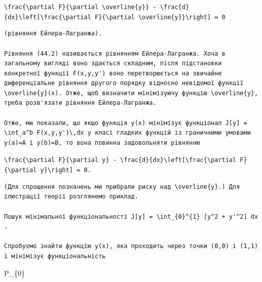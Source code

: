 \documentclass[
  ukrainian,
]{article}
\begin{document}
\texttt{\textbackslash{}frac\{\textbackslash{}partial\ F\}\{\textbackslash{}partial\ \textbackslash{}overline\{y\}\}\ -\ \textbackslash{}frac\{d\}\{dx\}\textbackslash{}left{[}\textbackslash{}frac\{\textbackslash{}partial\ F\}\{\textbackslash{}partial\ \textbackslash{}overline\{y\textquotesingle{}\}\}\textbackslash{}right{]}\ =\ 0}

\begin{verbatim}
(рівняння Ейлера-Лагранжа).

Рівняння (44.2) називається рівнянням Ейлера-Лагранжа. Хоча в загальному вигляді воно здається складним, після підстановки конкретної функції F(x,y,y') воно перетворюється на звичайне диференціальне рівняння другого порядку відносно невідомої функції \overline{y}(x). Отже, щоб визначити мінімізуючу функцію \overline{y}, треба розв'язати рівняння Ейлера-Лагранжа.

Отже, ми показали, що якщо функція y(x) мінімізує функціонал J[y] = \int_a^b F(x,y,y')\,dx у класі гладких функцій із граничними умовами y(a)=A і y(b)=B, то вона повинна задовольняти рівнянню
\end{verbatim}

\texttt{\textbackslash{}frac\{\textbackslash{}partial\ F\}\{\textbackslash{}partial\ y\}\ -\ \textbackslash{}frac\{d\}\{dx\}\textbackslash{}left{[}\textbackslash{}frac\{\textbackslash{}partial\ F\}\{\textbackslash{}partial\ y\textquotesingle{}\}\textbackslash{}right{]}\ =\ 0.}

\begin{verbatim}
(Для спрощення позначень ми прибрали риску над \overline{y}.) Для ілюстрації теорії розглянемо приклад.

Пошук мінімальної функціональності J[y] = \int_{0}^{1} [y^2 + y'^2] dx .

Спробуємо знайти функцію y(x), яка проходить через точки (0,0) і (1,1) і мінімізує функціональність
\end{verbatim}

P\_\{0\}
\end{document}
